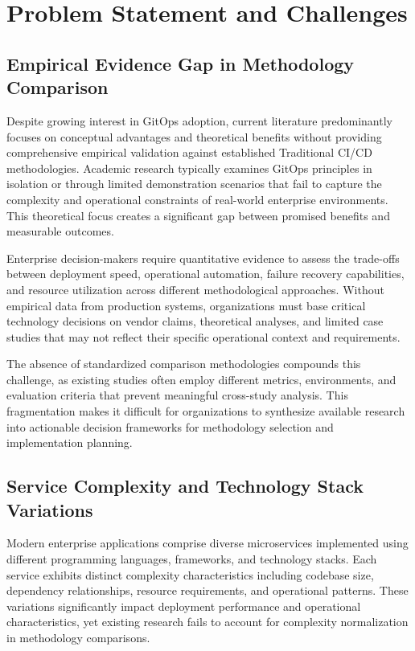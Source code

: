 \section{Problem Statement and Challenges}

\subsection{Empirical Evidence Gap in Methodology Comparison}
Despite growing interest in GitOps adoption, current literature predominantly focuses on conceptual advantages and theoretical benefits without providing comprehensive empirical validation against established Traditional CI/CD methodologies. Academic research typically examines GitOps principles in isolation or through limited demonstration scenarios that fail to capture the complexity and operational constraints of real-world enterprise environments. This theoretical focus creates a significant gap between promised benefits and measurable outcomes.

Enterprise decision-makers require quantitative evidence to assess the trade-offs between deployment speed, operational automation, failure recovery capabilities, and resource utilization across different methodological approaches. Without empirical data from production systems, organizations must base critical technology decisions on vendor claims, theoretical analyses, and limited case studies that may not reflect their specific operational context and requirements.

The absence of standardized comparison methodologies compounds this challenge, as existing studies often employ different metrics, environments, and evaluation criteria that prevent meaningful cross-study analysis. This fragmentation makes it difficult for organizations to synthesize available research into actionable decision frameworks for methodology selection and implementation planning.

\subsection{Service Complexity and Technology Stack Variations}
Modern enterprise applications comprise diverse microservices implemented using different programming languages, frameworks, and technology stacks. Each service exhibits distinct complexity characteristics including codebase size, dependency relationships, resource requirements, and operational patterns. These variations significantly impact deployment performance and operational characteristics, yet existing research fails to account for complexity normalization in methodology comparisons.

